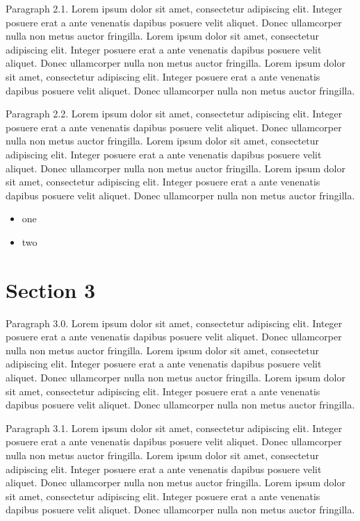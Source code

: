 \documentclass{article}
\begin{document}
Paragraph 2.1. Lorem ipsum dolor sit amet, consectetur adipiscing elit. Integer posuere erat a ante venenatis dapibus posuere velit aliquet. Donec ullamcorper nulla non metus auctor fringilla. Lorem ipsum dolor sit amet, consectetur adipiscing elit. Integer posuere erat a ante venenatis dapibus posuere velit aliquet. Donec ullamcorper nulla non metus auctor fringilla. Lorem ipsum dolor sit amet, consectetur adipiscing elit. Integer posuere erat a ante venenatis dapibus posuere velit aliquet. Donec ullamcorper nulla non metus auctor fringilla. 

Paragraph 2.2. Lorem ipsum dolor sit amet, consectetur adipiscing elit. Integer posuere erat a ante venenatis dapibus posuere velit aliquet. Donec ullamcorper nulla non metus auctor fringilla. Lorem ipsum dolor sit amet, consectetur adipiscing elit. Integer posuere erat a ante venenatis dapibus posuere velit aliquet. Donec ullamcorper nulla non metus auctor fringilla. Lorem ipsum dolor sit amet, consectetur adipiscing elit. Integer posuere erat a ante venenatis dapibus posuere velit aliquet. Donec ullamcorper nulla non metus auctor fringilla. 

\begin{itemize}
  \item one
  \item two
\end{itemize}


\section{Section 3}
Paragraph 3.0. Lorem ipsum dolor sit amet, consectetur adipiscing elit. Integer posuere erat a ante venenatis dapibus posuere velit aliquet. Donec ullamcorper nulla non metus auctor fringilla. Lorem ipsum dolor sit amet, consectetur adipiscing elit. Integer posuere erat a ante venenatis dapibus posuere velit aliquet. Donec ullamcorper nulla non metus auctor fringilla. Lorem ipsum dolor sit amet, consectetur adipiscing elit. Integer posuere erat a ante venenatis dapibus posuere velit aliquet. Donec ullamcorper nulla non metus auctor fringilla. 

Paragraph 3.1. Lorem ipsum dolor sit amet, consectetur adipiscing elit. Integer posuere erat a ante venenatis dapibus posuere velit aliquet. Donec ullamcorper nulla non metus auctor fringilla. Lorem ipsum dolor sit amet, consectetur adipiscing elit. Integer posuere erat a ante venenatis dapibus posuere velit aliquet. Donec ullamcorper nulla non metus auctor fringilla. Lorem ipsum dolor sit amet, consectetur adipiscing elit. Integer posuere erat a ante venenatis dapibus posuere velit aliquet. Donec ullamcorper nulla non metus auctor fringilla. 
\end{document}
